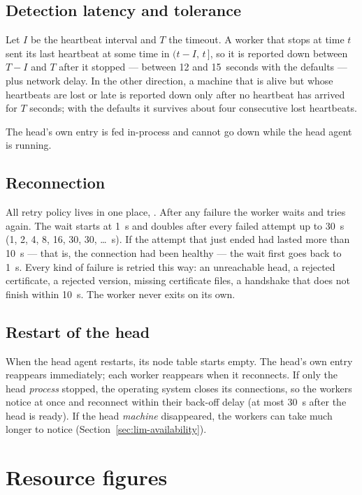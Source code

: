\documentclass{article}
\begin{document}
\subsection{Detection latency and tolerance}

Let $I$ be the heartbeat interval and $T$ the timeout. A worker that
stops at time $t$ sent its last heartbeat at some time in
$(t - I,\, t\,]$, so it is reported down between $T - I$ and $T$ after it
stopped --- between 12 and 15~seconds with the defaults --- plus network
delay. In the other direction, a machine that is alive but whose
heartbeats are lost or late is reported down only after no heartbeat has
arrived for $T$ seconds; with the defaults it survives about four
consecutive lost heartbeats.

The head's own entry is fed in-process and cannot go down while the head
agent is running.

\subsection{Reconnection}
\label{sec:reconnect}

All retry policy lives in one place, . After any
failure the worker waits and tries again. The wait starts at 1~s and
doubles after every failed attempt up to 30~s (1, 2, 4, 8, 16, 30, 30,
\dots~s). If the attempt that just ended had lasted more than 10~s --- that
is, the connection had been healthy --- the wait first goes back to 1~s.
Every kind of failure is retried this way: an unreachable head, a
rejected certificate, a rejected version, missing certificate files, a
handshake that does not finish within 10~s. The worker never exits on
its own.

\subsection{Restart of the head}

When the head agent restarts, its node table starts empty. The head's own
entry reappears immediately; each worker reappears when it reconnects. If
only the head \emph{process} stopped, the operating system closes its
connections, so the workers notice at once and reconnect within their
back-off delay (at most 30~s after the head is ready). If the head
\emph{machine} disappeared, the workers can take much longer to notice
(Section~\ref{sec:lim-availability}).

\section{Resource figures}
\label{sec:telemetry}
\end{document}
